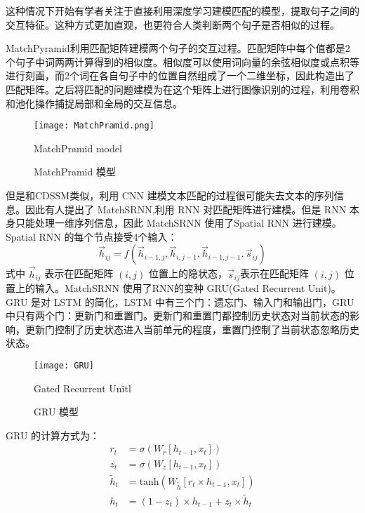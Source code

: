 这种情况下开始有学者关注于直接利用深度学习建模匹配的模型，提取句子之间的交互特征。这种方式更加直观，也更符合人类判断两个句子是否相似的过程。

MatchPyramid\cite{Pang2016TextMA}利用匹配矩阵建模两个句子的交互过程。匹配矩阵中每个值都是2个句子中词两两计算得到的相似度。相似度可以使用词向量的余弦相似度或点积等进行刻画，而2个词在各自句子中的位置自然组成了一个二维坐标，因此构造出了匹配矩阵。之后将匹配的问题建模为在这个矩阵上进行图像识别的过程，利用卷积和池化操作捕捉局部和全局的交互信息。

\begin{figure}[!htbp]\centering
  \texttt{[image: MatchPramid.png]}
  \caption{MatchPramid 模型}{MatchPramid model}
  \label{fig:MatchPramid}       %
\end{figure}

但是和CDSSM类似，利用 CNN 建模文本匹配的过程很可能失去文本的序列信息。因此有人提出了 MatchSRNN\cite{Wan2016MatchSRNNMT},利用 RNN 对匹配矩阵进行建模。但是 RNN 本身只能处理一维序列信息，因此 MatchSRNN 使用了Spatial RNN\cite{Graves2007MultidimensionalRN} 进行建模。Spatial RNN 的每个节点接受4个输入：
$$
\vec{h}_{ij} = f(\vec{h}_{i-1,j},\vec{h}_{i,j-1},\vec{h}_{i-1,j-1},\vec{s}_{ij})
$$
式中 $\vec{h}_{ij}$ 表示在匹配矩阵 $(i, j)$ 位置上的隐状态，$\vec{s}_{ij}$表示在匹配矩阵 $(i, j)$ 位置上的输入。MatchSRNN 使用了RNN的变种 GRU\cite{Cho2014LearningPR}(Gated Recurrent Unit)。 GRU 是对 LSTM 的简化，LSTM 中有三个门：遗忘门、输入门和输出门，GRU中只有两个门：更新门和重置门。更新门和重置门都控制历史状态对当前状态的影响，更新门控制了历史状态进入当前单元的程度，重置门控制了当前状态忽略历史状态。

\begin{figure}[!htbp]\centering
  \texttt{[image: GRU]}
  \caption{GRU 模型}{Gated Recurrent Unitl}
  \label{fig:GRU}       %
\end{figure}

GRU 的计算方式为：
$$
\begin{aligned}
r_t &= \sigma(W_r[h_{t-1},x_t])\\
z_t &= \sigma(W_z[h_{t-1},x_t])\\
\tilde{h}_t &= \text{tanh}(W_{\tilde{h}}[r_t \times h_{t-1},x_t]) \\
h_t &= (1-z_t)\times h_{t-1} + z_t\times\tilde{h}_t
\end{aligned}
$$


